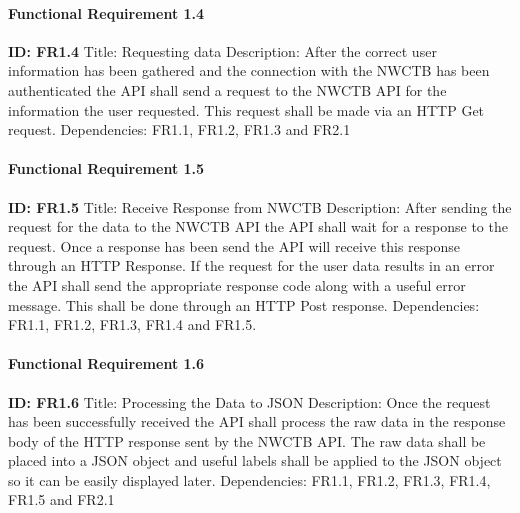 \documentclass[onecolumn, draftclsnofoot,10pt, compsoc]{article}
\begin{document}
					\paragraph{Functional Requirement 1.4}
						\textbf{ID: FR1.4}\newline
						Title: Requesting data\newline
						Description: After the correct user information has been gathered and the connection with the NWCTB has been authenticated the API shall send a request to the NWCTB API for the information the user requested. This request shall be made via an HTTP Get request.\newline
						Dependencies: FR1.1, FR1.2, FR1.3 and FR2.1\newline
					
					\paragraph{Functional Requirement 1.5}
						\textbf{ID: FR1.5}\newline
						Title: Receive Response from NWCTB\newline
						Description: After sending the request for the data to the NWCTB API the API shall wait for a response to the request. Once a response has been send the API will receive this response through an HTTP Response. If the request for the user data results in an error the API shall send the appropriate response code along with a useful error message. This shall be done through an HTTP Post response.\newline
						Dependencies: FR1.1, FR1.2, FR1.3, FR1.4 and FR1.5.\newline
						
					\paragraph{Functional Requirement 1.6}
							\textbf{ID: FR1.6}\newline
							Title: Processing the Data to JSON\newline
							Description: Once the request has been successfully received the API shall process the raw data in the response body of the HTTP response sent by the NWCTB API. The raw data shall be placed into a JSON object and useful labels shall be applied to the JSON object so it can be easily displayed later.\newline
							Dependencies: FR1.1, FR1.2, FR1.3, FR1.4, FR1.5 and FR2.1\newline
					
\end{document}
